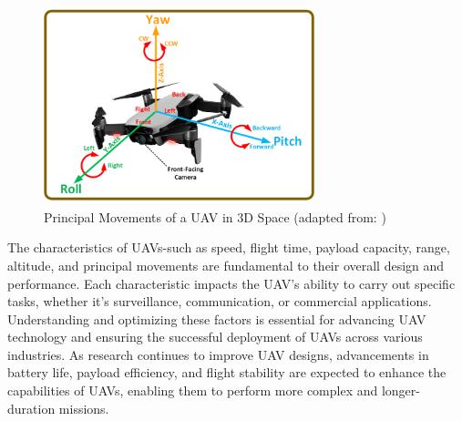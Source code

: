 

    \begin{figure}[H]  %
        \centering
        \includegraphics[width=0.7\textwidth]{Figures/Chapter1/Section2/1.png} 
        \caption{  Principal Movements of a UAV in 3D Space (adapted from: \cite{almahamid2024viznav})}
        \label{fig:method3_architecture} %
    \end{figure}



\vspace{0.5cm}

The characteristics of UAVs-such as speed, flight time, payload capacity, range, altitude, and principal movements are fundamental to their overall design and performance. Each characteristic impacts the UAV's ability to carry out specific tasks, whether it's surveillance, communication, or commercial applications. Understanding and optimizing these factors is essential for advancing UAV technology and ensuring the successful deployment of UAVs across various industries. As research continues to improve UAV designs, advancements in battery life, payload efficiency, and flight stability are expected to enhance the capabilities of UAVs, enabling them to perform more complex and longer-duration missions.


